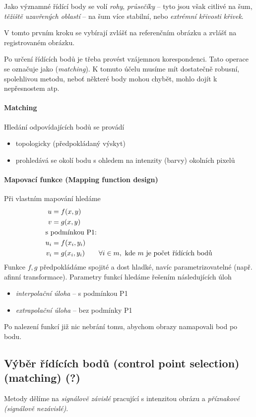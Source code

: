 Jako významné řídící body se volí \emph{rohy}, \emph{průsečíky} -- tyto jsou však citlivé na šum, \emph{těžiště uzavřených 
oblastí} -- na šum více stabilní, nebo \emph{extrémní křivosti křivek}.

V tomto prvním kroku se vybírají zvlášť na referenčním obrázku a zvlášť na registrovaném obrázku.

Po určení řídících bodů je třeba provést vzájemnou korespondenci. Tato operace se označuje jako (\emph{matching}). 
K tomuto účelu musíme mít dostatečně robusní, spolehlivou metodu, neboť některé body mohou chybět, mohlo dojít
k nepřesnostem atp. 

\paragraph{Matching}

Hledání odpovídajících bodů se provádí
\begin{itemize} 
\item topologicky (předpokládaný výskyt)
\item prohledává se okolí bodu s ohledem na intenzity (barvy) okolních pixelů
\end{itemize}

\paragraph{Mapovací funkce (Mapping function design)}

Při vlastním mapování hledáme
\begin{align}
u &= f(x,y)\\
v &= g(x,y)\\
\noalign{\hbox{s podmínkou P1:}\nonumber}
u_i &= f(x_i,y_i)\\
v_i &= g(x_i,y_i)\qquad\forall i\in m,\ \hbox{kde $m$ je počet řídících bodů}
\end{align}
Funkce $f,g$ předpokládáme spojité a dost hladké, navíc parametrizovatelné (např. afinní transformace). 
Parametry funkcí hledáme řešením následujících úloh
\begin{itemize}
\item \emph{interpolační úloha} -- s podmínkou P1
\item \emph{extrapolační úloha} -- bez podmínky P1
\end{itemize}
Po nalezení funkcí již nic nebrání tomu, abychom obrazy namapovali bod po bodu.

\subsection{Výběr řídících bodů (control point selection) (matching) (?)}
Metody dělíme na \emph{signálově závislé} pracující s intenzitou obrázu a \emph{příznakové (signálově nezávislé)}.

